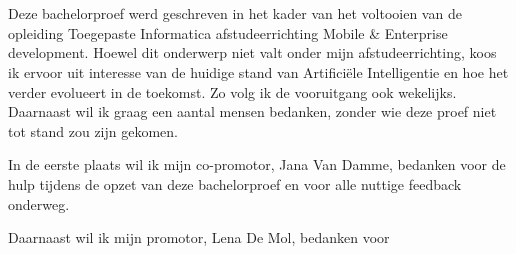 
\chapter*{}%
\label{ch:voorwoord}


Deze bachelorproef werd geschreven in het kader van het voltooien van de opleiding Toegepaste Informatica afstudeerrichting Mobile \& Enterprise development. Hoewel dit onderwerp niet valt onder mijn afstudeerrichting, koos ik ervoor uit interesse van de huidige stand van Artificiële Intelligentie en hoe het verder evolueert in de toekomst. Zo volg ik de vooruitgang ook wekelijks. Daarnaast wil ik graag een aantal mensen bedanken, zonder wie deze proef niet tot stand zou zijn gekomen.

In de eerste plaats wil ik mijn co-promotor, Jana Van Damme, bedanken voor de hulp tijdens de opzet van deze bachelorproef en voor alle nuttige feedback onderweg.

Daarnaast wil ik mijn promotor, Lena De Mol, bedanken voor
